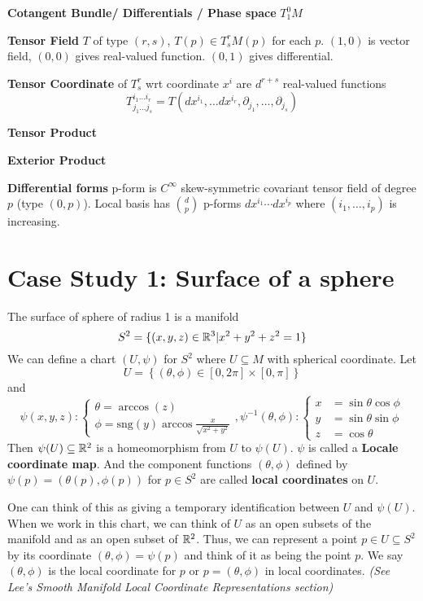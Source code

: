 \documentclass[12pt]{article}
\begin{document}
\textbf{Cotangent Bundle/ Differentials / Phase space} $T^0_1M$

\textbf{Tensor Field} $T$ of type $(r,s)$, $T(p) \in T^r_s M (p)$ for each $p$. $(1,0)$  is vector field, $(0,0)$ gives real-valued function. $(0, 1)$ gives differential.

\textbf{Tensor Coordinate} of $T^r_s$ wrt coordinate $x^i$ are $d^{r+s}$ real-valued functions $$T^{i_1\ldots i_r}_{j_1\ldots j_s} = T(dx^{i_1}, \ldots dx^{i_r}, \partial_{j_1}, \ldots , \partial_{j_s})$$

\textbf{Tensor Product}

\textbf{Exterior Product}

\textbf{Differential forms} p-form is $C^\infty$ skew-symmetric covariant tensor field of degree $p$ (type $(0,p)$). Local basis has ${d \choose p}$ p-forms $dx^{i_1}\cdots dx^{i_p}$ where $(i_1,\ldots,i_p)$ is increasing.

\onecolumn
\section{Case Study 1: Surface of a sphere}
The surface of sphere of radius 1 is a manifold $$S^2 = \{(x, y, z) \in \mathbb{R}^3 | x^2+y^2+z^2 = 1 \}$$
We can define a chart $(U, \psi)$ for $S^2$ where $U\subseteq M$ with spherical coordinate.  Let $$U = \left\{(\theta, \phi) \in [0, 2\pi]\times [0, \pi] \right\} $$
and $$
\psi(x,y,z): \begin{cases}
	\theta = \arccos(z) \\
	\phi = \text{sng}(y) \arccos \frac{x}{\sqrt{x^2 + y^2}}
\end{cases}, 
\psi^{-1}(\theta, \phi): 
\begin{cases}
	x &= \sin\theta \cos\phi \\
	y &= \sin\theta \sin\phi \\
	z &= \cos \theta
\end{cases} 
$$
Then $\psi(U) \subseteq \mathbb{R}^2$ is a homeomorphism from $U$ to $\psi(U)$. $\psi$ is called a \textbf{Locale coordinate map}. And the component functions $(\theta, \phi)$ defined by $\psi(p) = (\theta(p), \phi(p))$ for $p \in S^2$ are called \textbf{local coordinates} on $U$.

One can think of this as giving a temporary identification between $U$ and $\psi(U)$. When we work in this chart, we can think of $U$ as an open subsets of the manifold and as an open subset of $\mathbb{R}^2$. Thus, we can represent a point $p \in U \subseteq S^2$ by its coordinate $(\theta, \phi) = \psi(p)$ and think of it as being the point $p$. We say $(\theta, \phi)$ is the local coordinate for $p$ or $p = (\theta, \phi)$ in local coordinates. \textit{(See Lee's Smooth Manifold Local Coordinate Representations section)}
\end{document}
